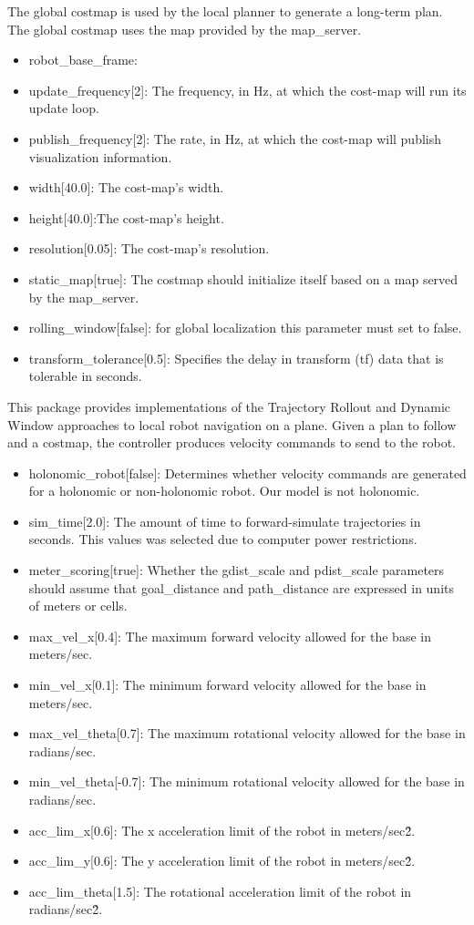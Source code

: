 \documentclass[10pt,journal,compsoc]{IEEEtran}
\begin{document}
The global costmap is used by the local planner to generate a long-term plan. The global costmap uses the map provided by the map\_server.

\begin{itemize}
\item robot\_base\_frame:
\item update\_frequency[2]: The frequency, in Hz, at which the cost-map will run its update loop. 
\item publish\_frequency[2]: The rate, in Hz, at which the cost-map will publish visualization information.
\item width[40.0]: The cost-map's width.
\item height[40.0]:The cost-map's height.
\item resolution[0.05]: The cost-map's resolution.
\item static\_map[true]: The costmap should initialize itself based on a map served by the map\_server.
\item rolling\_window[false]: for global localization this parameter must set to false.
\item transform\_tolerance[0.5]: Specifies the delay in transform (tf) data that is tolerable in seconds. 
\end{itemize}

This package provides implementations of the Trajectory Rollout and Dynamic Window approaches to local robot navigation on a plane. Given a plan to follow and a costmap, the controller produces velocity commands to send to the robot.

\begin{itemize}
\item holonomic\_robot[false]: Determines whether velocity commands are generated for a holonomic or non-holonomic robot. Our model is not holonomic.
\item sim\_time[2.0]: The amount of time to forward-simulate trajectories in seconds. This values was selected due to computer power restrictions.
\item meter\_scoring[true]: Whether the gdist\_scale and pdist\_scale parameters should assume that goal\_distance and path\_distance are expressed in units of meters or cells.
\item max\_vel\_x[0.4]: The maximum forward velocity allowed for the base in meters/sec.
\item min\_vel\_x[0.1]: The minimum forward velocity allowed for the base in meters/sec.
\item max\_vel\_theta[0.7]: The maximum rotational velocity allowed for the base in radians/sec.
\item min\_vel\_theta[-0.7]: The minimum rotational velocity allowed for the base in radians/sec.
\item acc\_lim\_x[0.6]: The x acceleration limit of the robot in meters/sec\^2.
\item acc\_lim\_y[0.6]: The y acceleration limit of the robot in meters/sec\^2.
\item acc\_lim\_theta[1.5]: The rotational acceleration limit of the robot in radians/sec\^2.
\end{itemize}
\end{document}
